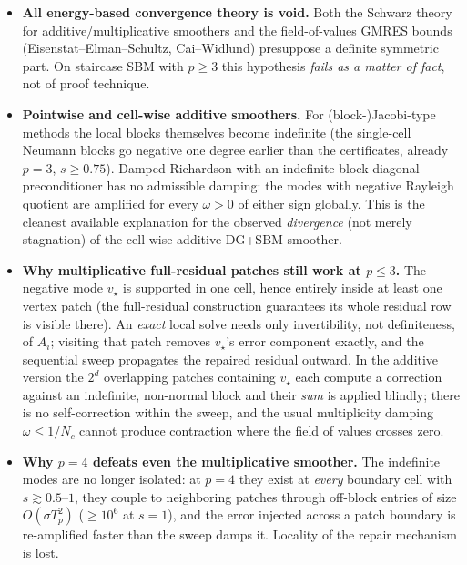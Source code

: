 \begin{itemize}
  \item \textbf{All energy-based convergence theory is void.} Both the
        Schwarz theory for additive/multiplicative smoothers and the
        field-of-values GMRES bounds (Eisenstat--Elman--Schultz,
        Cai--Widlund) presuppose a definite symmetric part. On staircase
        SBM with $p \ge 3$ this hypothesis \emph{fails as a matter of
        fact}, not of proof technique.
  \item \textbf{Pointwise and cell-wise additive smoothers.} For
        (block-)Jacobi-type methods the local blocks themselves become
        indefinite (the single-cell Neumann blocks go negative one degree
        earlier than the certificates, already $p=3$, $s \ge 0.75$).
        Damped Richardson with an indefinite block-diagonal preconditioner
        has no admissible damping: the modes with negative Rayleigh
        quotient are amplified for every $\omega > 0$ of either sign
        globally. This is the cleanest available explanation for the
        observed \emph{divergence} (not merely stagnation) of the
        cell-wise additive DG+SBM smoother.
  \item \textbf{Why multiplicative full-residual patches still work at
        $p \le 3$.} The negative mode $v_\star$ is supported in one cell,
        hence entirely inside at least one vertex patch (the full-residual
        construction guarantees its whole residual row is visible there).
        An \emph{exact} local solve needs only invertibility, not
        definiteness, of $A_i$; visiting that patch removes $v_\star$'s
        error component exactly, and the sequential sweep propagates the
        repaired residual outward. In the additive version the $2^d$
        overlapping patches containing $v_\star$ each compute a correction
        against an indefinite, non-normal block and their \emph{sum} is
        applied blindly; there is no self-correction within the sweep, and
        the usual multiplicity damping $\omega \le 1/N_c$ cannot produce
        contraction where the field of values crosses zero.
  \item \textbf{Why $p=4$ defeats even the multiplicative smoother.} The
        indefinite modes are no longer isolated: at $p=4$ they exist at
        \emph{every} boundary cell with $s \gtrsim 0.5$--$1$, they couple
        to neighboring patches through off-block entries of size
        $O(\sigma T_p^2)$ ($\ge 10^6$ at $s = 1$), and the error injected
        across a patch boundary is re-amplified faster than the sweep
        damps it. Locality of the repair mechanism is lost.
\end{itemize}

